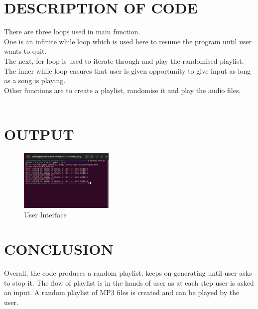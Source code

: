 \documentclass[journal,12pt,twocolumn]{IEEEtran}
\begin{document}
\section{DESCRIPTION OF CODE } There are three loops used in main function.\\
One is an infinite while loop which is used here to resume the program until user wants to quit.\\
The next, for loop is used to iterate through and play the randomised playlist.\\
The inner while loop ensures that user is given opportunity to give input as long as a song is playing.\\
Other functions are to create a playlist, randomise it and play the audio files.
\\
\\
\section{OUTPUT} 
\begin{figure}[h]
  \centering
  \includegraphics[bb=0 0 747 483,width=0.4\textwidth]{output.png}
  \captionsetup{justification=centering}
  \caption{User Interface}
\end{figure}
\section{CONCLUSION } Overall, the code produces a random playlist, keeps on generating until user asks to stop it. The flow of playlist is in the hands of user as at each step user is asked an input. A random playlist of MP3 files is created
and can be played by the user.
\end{document}
